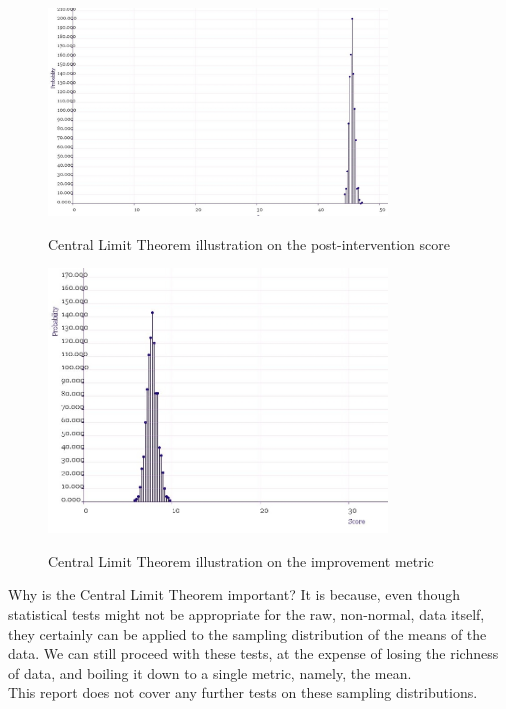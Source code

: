 \documentclass[10pt]{article}
\begin{document}
\begin{figure}
\caption{Central Limit Theorem illustration on the post-intervention score}
\label{CentralLimitTheoremPostTotal}
\begin{center}
\includegraphics[width=90mm]{ReportMedia/CentralLimitTheoremPostTotal.jpg}\\
\end{center}
\end{figure}

\begin{figure}
\caption{Central Limit Theorem illustration on the improvement metric}
\label{CentralLimitTheoremImprovement}
\begin{center}
\includegraphics[width=90mm]{ReportMedia/CentralLimitTheoremImprovement.jpg}\\
\end{center}
\end{figure}
Why is the Central Limit Theorem important? It is because, even though statistical tests might not be appropriate for the raw, non-normal, data itself, they certainly can be applied to the sampling distribution of the means of the data. We can still proceed with these tests, at the expense of losing the richness of data, and boiling it down to a single metric, namely, the mean.\\
This report does not cover any further tests on these sampling distributions.
\end{document}
